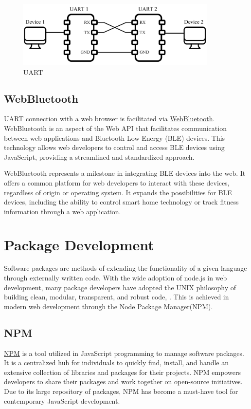 \documentclass{l4proj}
\begin{document}
\begin{figure}[!ht]
\begin{center}
    \includegraphics[width=10cm]{dissertation/images/UART_diagram.png}
\end{center}
\caption{UART}
    \label{fig:UART}
\end{figure}

\subsection{WebBluetooth}
\text UART connection with a web browser is facilitated via \href{https://developer.mozilla.org/en-US/docs/Web/API/Web_Bluetooth_API}{WebBluetooth}. WebBluetooth is an aspect of the Web API that facilitates communication between web applications and Bluetooth Low Energy (BLE) devices. This technology allows web developers to control and access BLE devices using JavaScript, providing a streamlined and standardized approach.

WebBluetooth represents a milestone in integrating BLE devices into the web. It offers a common platform for web developers to interact with these devices, regardless of origin or operating system. It expands the possibilities for BLE devices, including the ability to control smart home technology or track fitness information through a web application.

\section{Package Development}

Software packages are methods of extending the functionality of a given language through externally written code. With the wide adoption of node.js in web development, many package developers have adopted the UNIX philosophy of building clean, modular, transparent, and robust code, \cite{TheArtOfUNIXProgramming}. This is achieved in modern web development through the Node Package Manager(NPM).

\subsection{NPM}
\href{https://www.npmjs.com/}{NPM} \text is a tool utilized in JavaScript programming to manage software packages. It is a centralized hub for individuals to quickly find, install, and handle an extensive collection of libraries and packages for their projects. NPM empowers developers to share their packages and work together on open-source initiatives. Due to its large repository of packages, NPM has become a must-have tool for contemporary JavaScript development.
\end{document}
